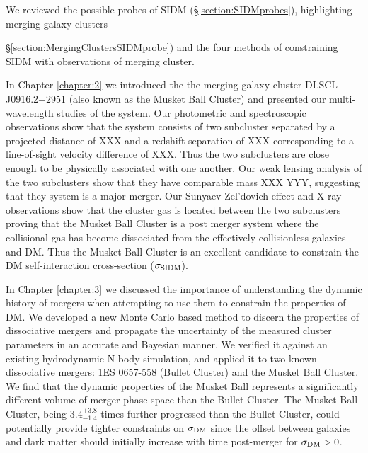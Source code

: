 We reviewed the possible probes of SIDM (\S\ref{section:SIDMprobes}), highlighting  merging galaxy clusters {\S\ref{section:MergingClustersSIDMprobe}) and the four methods of constraining SIDM with observations of merging cluster.

In Chapter \ref{chapter:2} we introduced the the merging galaxy cluster DLSCL J0916.2+2951 (also known as the Musket Ball Cluster) and presented our multi-wavelength studies of the system.
Our photometric and spectroscopic observations show that the system consists of two subcluster separated by a projected distance of XXX and a redshift separation of XXX corresponding to a line-of-sight velocity difference of XXX.
Thus the two subclusters are close enough to be physically associated with one another.
Our weak lensing analysis of the two subclusters show that they have comparable mass XXX YYY, suggesting that they system is a major merger.
Our Sunyaev-Zel'dovich effect and X-ray observations show that the cluster gas is located between the two subclusters proving that the Musket Ball Cluster is a post merger system where the collisional gas has become dissociated from the effectively collisionless galaxies and DM.
Thus the Musket Ball Cluster is an excellent candidate to constrain the DM self-interaction cross-section ($\sigma_{\rm SIDM}$).

In Chapter \ref{chapter:3} we discussed the importance of understanding the dynamic history of mergers when attempting to use them to constrain the properties of DM.
We developed a new Monte Carlo based method to discern the properties of dissociative mergers and propagate the uncertainty of the measured cluster parameters in an accurate and Bayesian manner.
We verified it against an existing hydrodynamic N-body simulation, and applied it to two known dissociative mergers: 1ES 0657-558 (Bullet Cluster) and the Musket Ball Cluster.
We find that the dynamic properties of the Musket Ball represents a significantly different volume of merger phase space than the Bullet Cluster.
The Musket Ball Cluster, being $3.4^{+3.8}_{-1.4}$ times further progressed than the Bullet Cluster, could potentially provide tighter constraints on $\sigma_{\rm DM}$ since the offset between galaxies and dark matter should initially increase with time post-merger for  $\sigma_{\rm DM}>0$.

}
